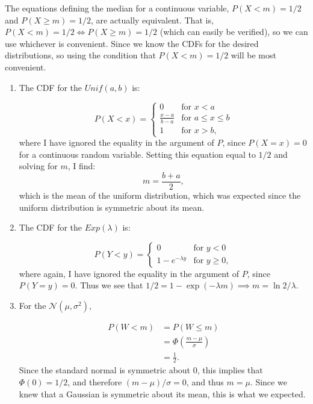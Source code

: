 \begin{problem}{12} The equations defining the median for a continuous variable, $P(X<m) =1/2$ and $P(X \ge m) =1/2$,  are actually equivalent.  That is, $P(X<m) =1/2 \Leftrightarrow  P(X \ge m)=1/2$ (which can easily be verified), so we can use whichever is convenient.  Since we know the CDFs for the desired distributions, so using the condition that $P(X<m) =1/2$ will be most convenient.

\begin{enumerate}
\item  The CDF for the $Unif(a, b)$ is:

\[
  P(X < x) =
  \begin{cases}
                                   0 & \text{for $x < a$} \\
                                  \frac{x-a}{b-a} & \text{for $a\le x \le b$} \\
                                   1 & \text{for $x > b$},
  \end{cases}
\]
where I have ignored the equality in the argument of $P$, since $P(X = x)=0$ for a continuous random variable.  Setting this equation equal to $1/2$ and solving for $m$, I find:
\begin{equation*}
m = \frac{b+a}{2},
\end{equation*}
which is the mean of the uniform distribution, which was expected since the uniform distribution is symmetric about its mean.

\item The CDF for the $Exp(\lambda)$ is:

\[
P(Y<y) = 
  \begin{cases}
                                   0 & \text{for $y < 0$} \\
                                   1-e^{-\lambda y} & \text{for $y \ge 0$},
  \end{cases}
\]
where again, I have ignored the equality in the argument of $P$, since $P(Y = y)=0$.  Thus we see that $1/2 = 1- \exp{(-\lambda m)} \implies m = \ln{2}/\lambda$.

\item For the $\mathcal N(\mu, \sigma^2)$, 

\begin{align*}
P(W < m) &= P(W \le m) \\
& = \Phi \left (\frac{m-\mu}{\sigma} \right) \\
& = \frac{1}{2}.
\end{align*}
Since the standard normal is symmetric about 0, this implies that $\Phi(0) = 1/2$, and therefore $(m-\mu)/\sigma = 0$, and thus $m=\mu$.  Since we knew that a Gaussian is symmetric about its mean, this is what we expected.


\end{enumerate}

\end{problem}



